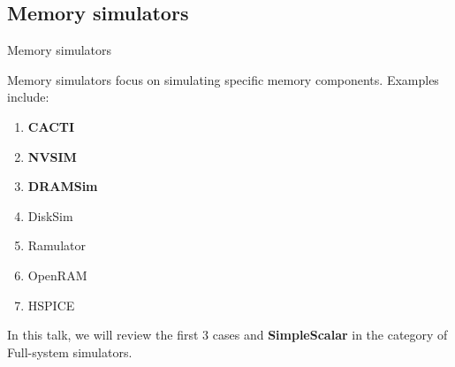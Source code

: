 \documentclass{beamer}
\begin{document}
\subsection{Memory simulators}
\begin{frame}{Memory simulators	}
	
	Memory simulators focus on simulating specific memory components. Examples include:
	\begin{enumerate}
		\item \textbf{CACTI}
		\item \textbf{NVSIM}
		\item \textbf{DRAMSim}
		\item DiskSim
		\item Ramulator
		\item OpenRAM
		\item HSPICE
	\end{enumerate}
	
	In this talk, we will review the first 3 cases and \textbf{SimpleScalar} in the category of Full-system simulators.
	
\end{frame}
\end{document}
